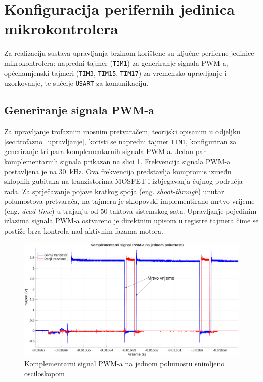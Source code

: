 \documentclass[diplomskirad]{fer}
\begin{document}
\section{Konfiguracija perifernih jedinica mikrokontrolera}
\label{sec:konfiguracija_periferije}

Za realizaciju sustava upravljanja brzinom korištene su ključne periferne
jedinice mikrokontrolera: napredni tajmer (\texttt{TIM1}) za generiranje
signala PWM-a, općenamjenski tajmeri (\texttt{TIM3}, \texttt{TIM15},
\texttt{TIM17}) za vremensko upravljanje i uzorkovanje, te sučelje
\texttt{USART} za komunikaciju.

\subsection{Generiranje signala PWM-a}
\label{ssec:generiranje_pwm}

Za upravljanje trofaznim mosnim pretvaračem, teorijski opisanim u odjeljku
\ref{sec:trofazno_upravljanje}, koristi se napredni tajmer \texttt{TIM1},
konfiguriran za generiranje tri para komplementarnih signala PWM-a. Jedan par komplementarnih signala prikazan na slici \ref{fig:comp_scope}. Frekvencija
signala PWM-a postavljena je na \SI{30}{\kilo\hertz}. Ova frekvencija
predstavlja kompromis između sklopnih gubitaka na tranzistorima MOSFET i
izbjegavanja čujnog područja rada. Za sprječavanje pojave kratkog spoja (eng.
\textit{shoot-through}) unutar polumostova pretvarača, na tajmeru je sklopovski
implementirano mrtvo vrijeme (eng. \textit{dead time}) u trajanju od 50 taktova
sistemskog sata. Upravljanje pojedinim izlazima signala PWM-a ostvareno je
direktnim upisom u registre tajmera čime se postiže brza kontrola nad aktivnim
fazama motora.
\begin{figure}[h!]
	\centering
	\includegraphics[width=\textwidth]{csv/comp.pdf}
	\caption{Komplementarni signal PWM-a na jednom polumostu snimljeno osciloskopom}
	\label{fig:comp_scope}
\end{figure}
\end{document}
